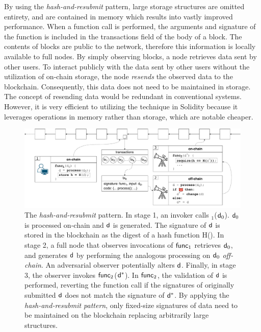 By using the \emph{hash-and-resubmit} pattern, large storage structures are
omitted entirety, and are contained in memory which results into vastly
improved performance. When a function call is performed, the arguments and
signature of the function is included in the transactions field of the body of
a block. The contents of blocks are public to the network, therefore this
information is locally available to full nodes. By simply observing blocks, a
node retrieves data sent by other users. To interact publicly with the data
sent by other users without the utilization of on-chain storage, the node
\emph{resends} the observed data to the blockchain. Consequently, this data
does not need to be maintained in storage. The concept of resending data would
be redundant in conventional systems. However, it is very efficient to
utilizing the technique in Solidity because it leverages operations in memory
rather than storage, which are notable cheaper.
\begin{figure}[h]
    \begin{center} \includegraphics[width=1\textwidth]{figures/har-pattern.pdf}
    \end{center}

    \caption{The \emph{hash-and-resubmit} pattern. In stage 1, an invoker calls
        \proc$_1$($\mathsf{d}_0$). $\mathsf{d}_0$ is processed on-chain and $\mathsf{d}$ is
        generated. The signature of $\mathsf{d}$ is stored in the blockchain as the
        digest of a hash function \textsf{H}(). In stage 2, a full node that
        observes invocations of $\textsf{func}_1$ retrieves $\mathsf{d}_0$, and generates
        $\mathsf{d}$ by performing the analogous processing on $\mathsf{d}_0$
        \emph{off-chain}. An adversarial observer potentially alters $\mathsf{d}$.
        Finally, in stage 3, the observer invokes $\textsf{func}_2$($\mathsf{d}^*$). In
        $\textsf{func}_2$, the validation of $\mathsf{d}$ is performed, reverting the
        function call if the signatures of originally submitted $\mathsf{d}$ does
        not match the signature of $\mathsf{d}^*$. By applying the
        \emph{hash-and-resubmit pattern}, only fixed-size signatures of data
        need to be maintained on the blockchain replacing arbitrarily large
        structures.}

        \label{fig:har-pattern}
\end{figure}

